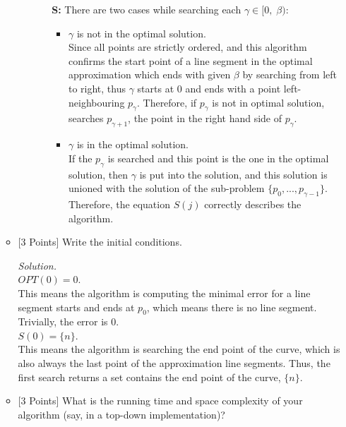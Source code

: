 \documentclass[10pt]{article}
\begin{document}
\begin{enumerate}
\begin{itemize}
\begin{mdframed}
\begin{itemize}[leftmargin=20.7mm]
\begin{itemize}
                   \item[\textbf{S: }] There are two cases while searching each $\gamma \in [0, \; \beta)$:
                   \begin{itemize}
                       \item $\gamma$ is not in the optimal solution.\\
                        Since all points are strictly ordered, and this algorithm confirms the start point of a line segment in the optimal approximation which ends with given $\beta$ by searching from left to right, thus $\gamma$ starts at 0 and ends with a point left-neighbouring $p_{\gamma}$. Therefore, if $p_{\gamma}$ is not in optimal solution, searches $p_{\gamma + 1}$, the point in the right hand side of $p_{\gamma}$.\\
                       \item $\gamma$ is in the optimal solution.\\
                       If the $p_{\gamma}$ is searched and this point is the one in the optimal solution, then $\gamma$ is put into the solution, and this solution is unioned with the solution of the sub-problem $\{p_0, ..., p_{\gamma - 1}\}$. Therefore, the equation $S(j)$ correctly describes the algorithm.
                   \end{itemize}
               \end{itemize}
           \end{itemize}
        \end{mdframed}
        \item {[3 Points]} Write the initial conditions.
        \begin{mdframed}
            \textit{Solution.}\\
            $OPT(0) = 0$.\\ This means the algorithm is computing the minimal error for a line segment starts and ends at $p_0$, which means there is no line segment. Trivially, the error is 0.\\
            $S(0) = \{n\}.$\\
            This means the algorithm is searching the end point of the curve, which is also always the last point of the approximation line segments. Thus, the first search returns a set contains the end point of the curve, $\{n\}$.
        \end{mdframed}
        \item {[3 Points]} What is the running time and space complexity of your algorithm (say, in a top-down implementation)?

\end{itemize}
\end{enumerate}
\end{document}

